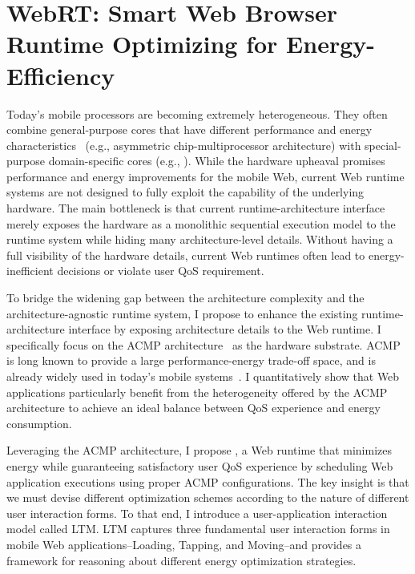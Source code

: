 
\chapter{WebRT: Smart Web Browser Runtime Optimizing for Energy-Efficiency}
\label{sec:runtime}

Today's mobile processors are becoming extremely heterogeneous. They often combine general-purpose cores that have different performance and energy characteristics~\cite{single-ISA} (e.g., asymmetric chip-multiprocessor architecture) with special-purpose domain-specific cores (e.g., \webcore). While the hardware upheaval promises performance and energy improvements for the mobile Web, current Web runtime systems are not designed to fully exploit the capability of the underlying hardware. The main bottleneck is that current runtime-architecture interface merely exposes the hardware as a monolithic sequential execution model to the runtime system while hiding many architecture-level details. Without having a full visibility of the hardware details, current Web runtimes often lead to energy-inefficient decisions or violate user QoS requirement.

To bridge the widening gap between the architecture complexity and the architecture-agnostic runtime system, I propose to enhance the existing runtime-architecture interface by exposing architecture details to the Web runtime. I specifically focus on the ACMP architecture~\cite{acmp,single-ISA} as the hardware substrate. ACMP is long known to provide a large performance-energy trade-off space, and is already widely used in today's mobile systems~\cite{big-little-future,exynos5biglittle}. I  quantitatively show that Web applications particularly benefit from the heterogeneity offered by the ACMP architecture to achieve an ideal balance between QoS experience and energy consumption.

Leveraging the ACMP architecture, I propose \webrt, a Web runtime that minimizes energy while guaranteeing satisfactory user QoS experience by scheduling Web application executions using proper ACMP configurations. The key insight is that we must devise different optimization schemes according to the nature of different user interaction forms. To that end, I introduce a user-application interaction model called LTM. LTM captures three fundamental user interaction forms in mobile Web applications--Loading, Tapping, and Moving--and provides a framework for reasoning about different energy optimization strategies.

